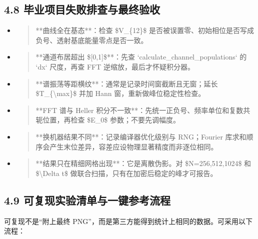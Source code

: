 \documentclass[UTF8,openany,11pt,fontset=fandol]{ctexbook}
\begin{document}
\subsection{\texorpdfstring{\textbf{4.8
毕业项目失败排查与最终验收}}{4.8 毕业项目失败排查与最终验收}}\label{ux6bd5ux4e1aux9879ux76eeux5931ux8d25ux6392ux67e5ux4e0eux6700ux7ec8ux9a8cux6536}

\begin{itemize}
\item
  \begin{quote}
  **曲线全在基态**：检查 \$V\_\{12\}\$
  是否被误置零、初始相位是否写成负号、透射基底能量零点是否一致。
  \end{quote}
\item
  \begin{quote}
  **通道布居超出 \${[}0,1{]}\$**：先查 `calculate\_channel\_populations`
  的 `dx` 尺度，再查 FFT 逆缩放，最后才怀疑积分器。
  \end{quote}
\item
  \begin{quote}
  **谱振荡等距横纹**：通常是记录时间窗截断且无窗；延长
  \$T\_\{\textbackslash max\}\$ 并加 Hann 窗，重新做峰位稳定性检查。
  \end{quote}
\item
  \begin{quote}
  **FFT 谱与 Heller
  积分不一致**：先统一正负号、频率单位和复数共轭位置，再检查 \$E\_0\$
  参数；不要先调幅度。
  \end{quote}
\item
  \begin{quote}
  **换机器结果不同**：记录编译器优化级别与 RNG；Fourier
  库求和顺序会产生末位差异，容差应设物理显著精度而非逐位相同。
  \end{quote}
\item
  \begin{quote}
  **结果只在精细网格出现**：它是离散伪影。对 \$N=256,512,1024\$ 和
  \$\textbackslash Delta t\$ 做联合扫描，只有在加密后稳定的峰才可报告。
  \end{quote}
\end{itemize}

\subsection{\texorpdfstring{\textbf{4.9
可复现实验清单与一键参考流程}}{4.9 可复现实验清单与一键参考流程}}\label{ux53efux590dux73b0ux5b9eux9a8cux6e05ux5355ux4e0eux4e00ux952eux53c2ux8003ux6d41ux7a0b}

可复现不是``附上最终
PNG''，而是第三方能得到统计上相同的数据。可采用以下流程：
\end{document}
